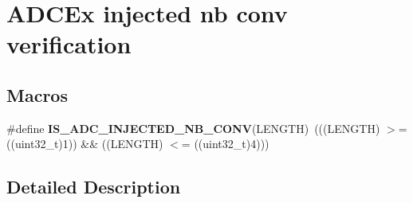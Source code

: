 \hypertarget{group___a_d_c_ex__injected__nb__conv__verification}{\section{A\-D\-C\-Ex injected nb conv verification}
\label{group___a_d_c_ex__injected__nb__conv__verification}
}
\subsection*{Macros}
\begin{DoxyCompactItemize}
\item 
\hypertarget{group___a_d_c_ex__injected__nb__conv__verification_ga4fa3b4cff7cfd5045f5430b80ca58edc}{\#define {\bfseries I\-S\-\_\-\-A\-D\-C\-\_\-\-I\-N\-J\-E\-C\-T\-E\-D\-\_\-\-N\-B\-\_\-\-C\-O\-N\-V}(L\-E\-N\-G\-T\-H)~(((L\-E\-N\-G\-T\-H) $>$= ((uint32\-\_\-t)1)) \&\& ((L\-E\-N\-G\-T\-H) $<$= ((uint32\-\_\-t)4)))}\label{group___a_d_c_ex__injected__nb__conv__verification_ga4fa3b4cff7cfd5045f5430b80ca58edc}

\end{DoxyCompactItemize}


\subsection{Detailed Description}
